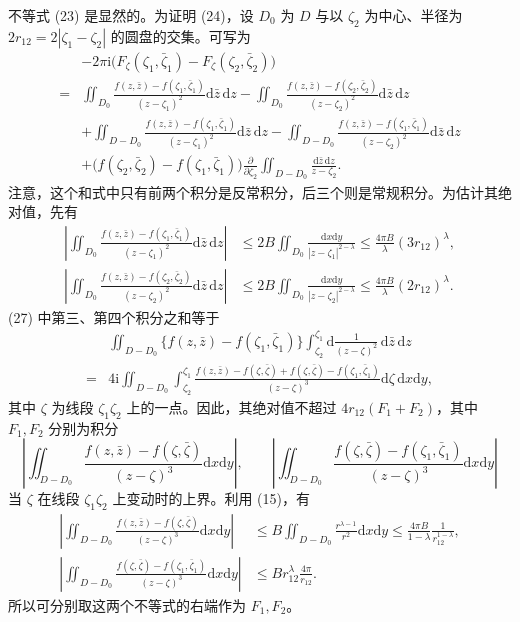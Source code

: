 \documentclass[UTF8,a4paper,11pt,fontset=fandol]{ctexart}
\newcommand{\dd}{\mathrm d}
\newcommand{\ii}{\mathrm i}
\newcommand{\dz}{\dd\bar z\,\dd z}
\newcommand{\zz}{\bar\zeta}
\begin{document}
不等式 (23) 是显然的。为证明 (24)，设 $D_0$ 为 $D$ 与以 $\zeta_2$ 为中心、半径为 $2r_{12}=2|\zeta_1-\zeta_2|$ 的圆盘的交集。可写为
\begin{equation}\begin{aligned}
&-2\pi\ii\bigl(F_\zeta(\zeta_1,\bar\zeta_1)-F_\zeta(\zeta_2,\bar\zeta_2)\bigr)\\
={}&\iint_{D_0}\frac{f(z,\bar z)-f(\zeta_1,\bar\zeta_1)}{(z-\zeta_1)^2}\dz
-\iint_{D_0}\frac{f(z,\bar z)-f(\zeta_2,\bar\zeta_2)}{(z-\zeta_2)^2}\dz\\
&+\iint_{D-D_0}\frac{f(z,\bar z)-f(\zeta_1,\bar\zeta_1)}{(z-\zeta_1)^2}\dz
-\iint_{D-D_0}\frac{f(z,\bar z)-f(\zeta_1,\bar\zeta_1)}{(z-\zeta_2)^2}\dz\\
&+\bigl(f(\zeta_2,\bar\zeta_2)-f(\zeta_1,\bar\zeta_1)\bigr)
\frac{\partial}{\partial\zeta_2}\iint_{D-D_0}\frac{\dz}{z-\zeta_2}.
\end{aligned}\tag{27}\end{equation}
注意，这个和式中只有前两个积分是反常积分，后三个则是常规积分。为估计其绝对值，先有
\begin{align*}
\left|\iint_{D_0}\frac{f(z,\bar z)-f(\zeta_1,\bar\zeta_1)}{(z-\zeta_1)^2}\dz\right|
&\le2B\iint_{D_0}\frac{\dd x\dd y}{|z-\zeta_1|^{2-\lambda}}\le\frac{4\pi B}\lambda(3r_{12})^\lambda,\\
\left|\iint_{D_0}\frac{f(z,\bar z)-f(\zeta_2,\bar\zeta_2)}{(z-\zeta_2)^2}\dz\right|
&\le2B\iint_{D_0}\frac{\dd x\dd y}{|z-\zeta_2|^{2-\lambda}}\le\frac{4\pi B}\lambda(2r_{12})^\lambda.
\end{align*}
(27) 中第三、第四个积分之和等于
\begin{align*}
&\iint_{D-D_0}\{f(z,\bar z)-f(\zeta_1,\bar\zeta_1)\}\int_{\zeta_2}^{\zeta_1}\dd\frac1{(z-\zeta)^2}\,\dz\\
={}&4\ii\iint_{D-D_0}\int_{\zeta_2}^{\zeta_1}
\frac{f(z,\bar z)-f(\zeta,\zz)+f(\zeta,\zz)-f(\zeta_1,\bar\zeta_1)}{(z-\zeta)^3}\dd\zeta\,\dd x\dd y,
\end{align*}
其中 $\zeta$ 为线段 $\zeta_1\zeta_2$ 上的一点。因此，其绝对值不超过 $4r_{12}(F_1+F_2)$，其中 $F_1,F_2$ 分别为积分
\[\left|\iint_{D-D_0}\frac{f(z,\bar z)-f(\zeta,\zz)}{(z-\zeta)^3}\dd x\dd y\right|,\qquad
\left|\iint_{D-D_0}\frac{f(\zeta,\zz)-f(\zeta_1,\bar\zeta_1)}{(z-\zeta)^3}\dd x\dd y\right|\]
当 $\zeta$ 在线段 $\zeta_1\zeta_2$ 上变动时的上界。利用 (15)，有
\begin{align*}
\left|\iint_{D-D_0}\frac{f(z,\bar z)-f(\zeta,\zz)}{(z-\zeta)^3}\dd x\dd y\right|
&\le B\iint_{D-D_0}\frac{r^{\lambda-1}}{r^2}\dd x\dd y
\le\frac{4\pi B}{1-\lambda}\frac1{r_{12}^{1-\lambda}},\\
\left|\iint_{D-D_0}\frac{f(\zeta,\zz)-f(\zeta_1,\bar\zeta_1)}{(z-\zeta)^3}\dd x\dd y\right|
&\le Br_{12}^{\lambda}\frac{4\pi}{r_{12}}.
\end{align*}
所以可分别取这两个不等式的右端作为 $F_1,F_2$。
\end{document}

